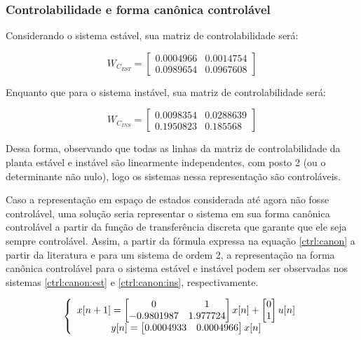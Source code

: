 \subsubsection{Controlabilidade e forma canônica controlável}

Considerando o sistema estável, sua matriz de controlabilidade será:

\begin{equation} \label{ctrl:1}
    W_{C_{EST}} = \begin{bmatrix}  0.0004966 & 0.0014754\\ 0.0989654 & 0.0967608\end{bmatrix}
\end{equation}

Enquanto que para o sistema instável, sua matriz de controlabilidade será:

\begin{equation} \label{ctrl:2}
    W_{C_{INS}} = \begin{bmatrix}  0.0098354 & 0.0288639\\ 0.1950823 & 0.185568\end{bmatrix}
\end{equation}

Dessa forma, observando que todas as linhas da matriz de controlabilidade da planta estável e instável são linearmente independentes, com posto 2 (ou o determinante não nulo), logo os sistemas nessa representação são controláveis.

Caso a representação em espaço de estados considerada até agora não fosse controlável, uma solução seria representar o sistema em sua forma canônica controlável a partir da função de transferência discreta que garante que ele seja sempre controlável. Assim, a partir da fórmula expressa na equação \ref{ctrl:canon} a partir da literatura e para um sistema de ordem 2, a representação na forma canônica controlável para o sistema estável e instável podem ser observadas nos sistemas \ref{ctrl:canon:est} e \ref{ctrl:canon:ins}, respectivamente.


\begin{equation} \label{ctrl:canon:est}
\centering
\left \{
\begin{array}{cc}
x[n+1] = \begin{bmatrix} 0 & 1 \\ -0.9801987 & 1.977724 \end{bmatrix} x[n] + \begin{bmatrix} 0 \\ 1 \end{bmatrix} u[n] \\
y[n] = \begin{bmatrix} 0.0004933 & 0.0004966  \end{bmatrix} x[n] \\
\end{array}
\right.
\end{equation}

